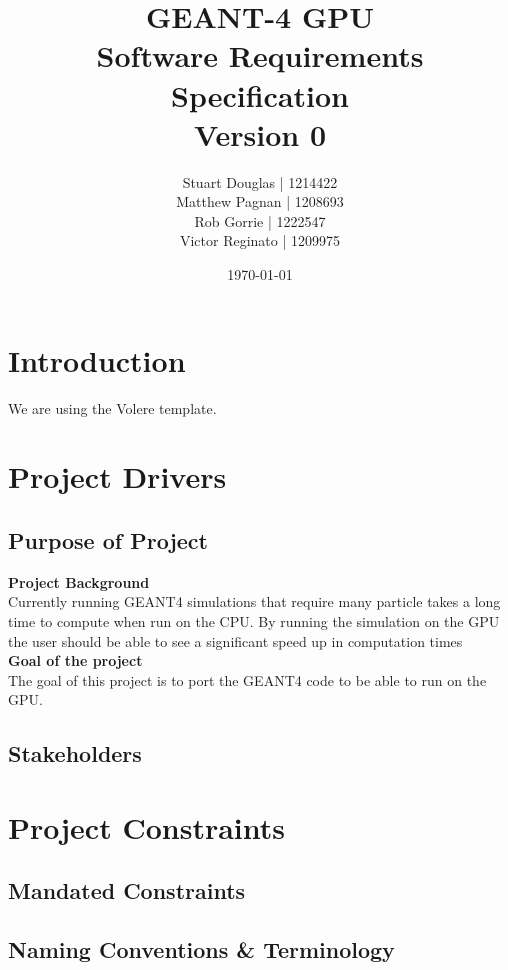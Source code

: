 \documentclass[12pt]{article}
\title{\Huge{GEANT-4 GPU} \LARGE{\\\vspace{7.5mm}\textbf{Software Requirements
 Specification}\\Version 0\vspace{10mm}}}
\author{Stuart Douglas | 1214422\\Matthew Pagnan | 1208693\\Rob Gorrie |
 1222547\\Victor Reginato | 1209975\vspace{10mm}}
\date{\today}
\begin{document}
\maketitle
\newpage

\tableofcontents
\newpage

\section{Introduction}
We are using the Volere template. %

 
\section{Project Drivers}

\subsection{Purpose of Project} %
\textbf{Project Background}\\
Currently running GEANT4 simulations that require many particle takes a long time to compute when run on the CPU. By running the simulation on the GPU the user should be able to see a significant speed up in computation times\\
\newline
\textbf{Goal of the project}\\
The goal of this project is to port the GEANT4 code to be able to run on the GPU.

\subsection{Stakeholders} %

\section{Project Constraints}
\subsection{Mandated Constraints} %

\subsection{Naming Conventions \& Terminology} %
\end{document}
